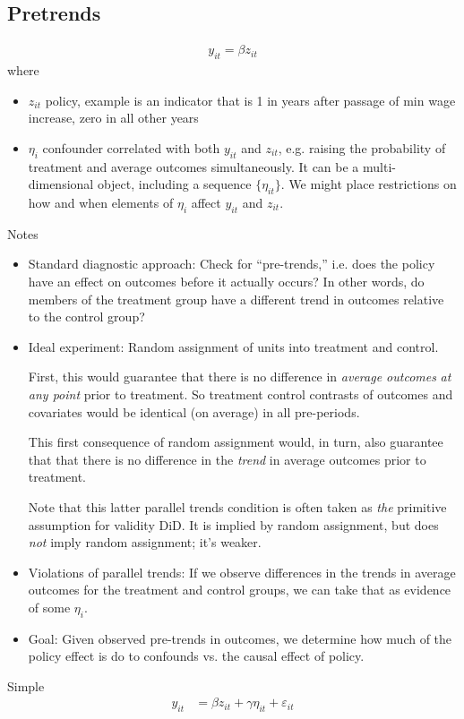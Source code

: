 \documentclass[12pt]{article}
\theoremstyle{plain}
\theoremstyle{definition}
\theoremstyle{remark}
\begin{document}
\clearpage
\subsection{Pretrends}

\begin{align*}
  y_{it} = \beta z_{it}
\end{align*}
where
\begin{itemize}
  \item $z_{it}$ policy, example is an indicator that is 1 in years
    after passage of min wage increase, zero in all other years
  \item $\eta_i$ confounder correlated with both $y_{it}$ and $z_{it}$,
    e.g. raising the probability of treatment and average outcomes
    simultaneously.
    It can be a multi-dimensional object, including a sequence
    $\{\eta_{it}\}$.
    We might place restrictions on how and when elements of $\eta_i$
    affect $y_{it}$ and $z_{it}$.
\end{itemize}
Notes
\begin{itemize}
  \item
    Standard diagnostic approach:
    Check for ``pre-trends,'' i.e. does the policy have an effect on
    outcomes before it actually occurs?
    In other words, do members of the treatment group have a different
    trend in outcomes relative to the control group?

  \item
    Ideal experiment:
    Random assignment of units into treatment and control.

    First, this would guarantee that there is no difference in
    \emph{average outcomes} \emph{at any point} prior to treatment.
    So treatment control contrasts of outcomes and covariates would be
    identical (on average) in all pre-periods.

    This first consequence of random assignment would, in turn,
    also guarantee that that there is no difference in the \emph{trend}
    in average outcomes prior to treatment.

    Note that this latter parallel trends condition is often taken
    as \emph{the} primitive assumption for validity DiD.
    It is implied by random assignment, but does \emph{not} imply random
    assignment; it's weaker.

  \item
    Violations of parallel trends:
    If we observe differences in the trends in average outcomes for the
    treatment and control groups, we can take that as evidence of some
    $\eta_i$.

  \item
    Goal:
    Given observed pre-trends in outcomes, we determine how much of the
    policy effect is do to confounds vs. the causal effect of policy.

\end{itemize}
Simple
\begin{align*}
  y_{it} &= \beta z_{it} + \gamma \eta_{it} + \varepsilon_{it}
\end{align*}
\end{document}
